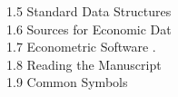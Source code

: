 1.5 Standard Data Structures\\
1.6 Sources for Economic Dat\\
1.7 Econometric Software .\\
1.8 Reading the Manuscript\\
1.9 Common Symbols